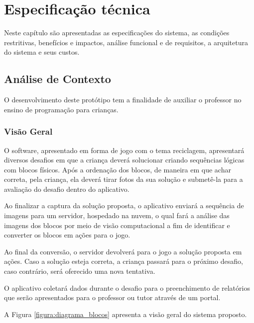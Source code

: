 \chapter{Especificação técnica} \label{cap:especificacao_tecnica}
Neste capítulo são apresentadas as especificações do sistema, as condições restritivas, benefícios e impactos, análise funcional e de requisitos, a arquitetura do sistema e seus custos.

\section{Análise de Contexto}

    O desenvolvimento deste protótipo tem a finalidade de auxiliar o professor no ensino de programação para crianças.
    
    \subsection{Visão Geral}
    
    O software, apresentado em forma de jogo com o tema reciclagem, apresentará diversos desafios em que a criança deverá solucionar criando sequências lógicas com blocos físicos. Após a ordenação dos blocos, de maneira em que achar correta, pela criança, ela deverá tirar fotos da sua solução e submetê-la para a avaliação do desafio dentro do aplicativo.
    
    Ao finalizar a captura da solução proposta, o aplicativo enviará a sequência de imagens para um servidor, hospedado na nuvem, o qual fará a análise das imagens dos blocos
    por meio de visão computacional a fim de identificar e converter os blocos em ações para o jogo.
    
    Ao final da conversão, o servidor devolverá para o jogo a solução proposta em ações.
    Caso a solução esteja correta, a criança passará para o próximo desafio, caso contrário, será oferecido uma nova tentativa.
    
    O aplicativo coletará dados durante o desafio para o preenchimento de relatórios que serão apresentados para o professor ou tutor através de um portal.
    
    A Figura \ref{figura:diagrama_blocos} apresenta a visão geral do sistema proposto.
  

